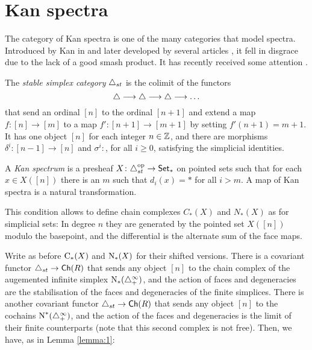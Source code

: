 
\section{Kan spectra}\label{s:9Kanspectra}

The category of Kan spectra is one of the many categories that model spectra. Introduced by Kan in \cite{Kan1963} and later developed by several articles \cite{burghelea_kanspectraI1967, burghelea_kanspectraII_1968, burghelea_kanspectraIII1969,Brown1973}, it fell in disgrace due to the lack of a good smash product. It has recently received some attention \cite{Stephan2015, CKP2023}. 

\begin{definition}
    The \emph{stable simplex category} $\triangle_{st}$ is the colimit of the functors
    \[
        \triangle\longrightarrow \triangle\longrightarrow \triangle\longrightarrow \ldots
    \]
    that send an ordinal $[n]$ to the ordinal $[n+1]$ and extend a map $f\colon [n]\to [m]$ to a map $f'\colon [n+1]\to [m+1]$ by setting $f'(n+1) = m+1$. It has one object $[n]$ for each integer $n\in \mathbb{Z}$, and there are morphisms $\delta^i\colon [n-1]\to [n]$ and $\sigma^i\colon $, for all $i\geq 0$, satisfying the simplicial identities.
\end{definition}
\begin{definition}
    A \emph{Kan spectrum} is a presheaf $X\colon \triangle_{st}^{{\mathrm{op}}}\to \mathsf{Set}_*$ on pointed sets such that for each $x\in X([n])$ there is an $m$ such that $d_i(x) = *$ for all $i>m$. A map of Kan spectra is a natural transformation.
\end{definition}

This condition allows to define chain complexes $C_*(X)$ and $N_*(X)$ as for simplicial sets: In degree $n$ they are generated by the pointed set $X([n])$ modulo the basepoint, and the differential is the alternate sum of the face maps.

Write as before $\operatorname{C}_*(X)$ and $\operatorname{N}_*(X)$ for their shifted versions. There is a covariant functor $\triangle_{st}\to \mathsf{Ch}(R)$ that sends any object $[n]$ to the chain complex of the augemented infinite simplex $\operatorname{N}_*(\triangle_{+}^\infty)$, and the action of faces and degeneracies are the stabilisation of the faces and degeneracies of the finite simplices. There is another covariant functor $\triangle_{st}\to \mathsf{Ch}(R)$ that sends any object $[n]$ to the cochains $\operatorname{N}^*(\triangle_{+}^\infty)$, and the action of the faces and degeneracies is the limit of their finite counterparts (note that this second complex is not free). Then, we have, as in Lemma \ref{lemma:1}:

